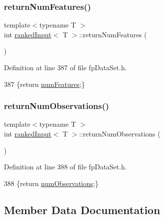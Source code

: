 \subsubsection{\texorpdfstring{return\+Num\+Features()}{returnNumFeatures()}}
{\footnotesize\ttfamily template$<$typename T $>$ \\
int \hyperlink{classrankedInput}{ranked\+Input}$<$ T $>$\+::return\+Num\+Features (\begin{DoxyParamCaption}{ }\end{DoxyParamCaption})\hspace{0.3cm}{\ttfamily [inline]}}



Definition at line 387 of file fp\+Data\+Set.\+h.


\begin{DoxyCode}
387 \{\textcolor{keywordflow}{return} \hyperlink{classrankedInput_ad86e2ad8f4044697450ddfdb15aa10a9}{numFeatures};\}
\end{DoxyCode}
\mbox{\label{classrankedInput_a0760d6140433f4935f57f0d2cdabeef9}} 
\subsubsection{\texorpdfstring{return\+Num\+Observations()}{returnNumObservations()}}
{\footnotesize\ttfamily template$<$typename T $>$ \\
int \hyperlink{classrankedInput}{ranked\+Input}$<$ T $>$\+::return\+Num\+Observations (\begin{DoxyParamCaption}{ }\end{DoxyParamCaption})\hspace{0.3cm}{\ttfamily [inline]}}



Definition at line 388 of file fp\+Data\+Set.\+h.


\begin{DoxyCode}
388 \{\textcolor{keywordflow}{return} \hyperlink{classrankedInput_a7b0e6ebcf6fa2fcd0b08918e3b3020be}{numObservations};\}
\end{DoxyCode}


\subsection{Member Data Documentation}
\mbox{\label{classrankedInput_ad86e2ad8f4044697450ddfdb15aa10a9}} 
